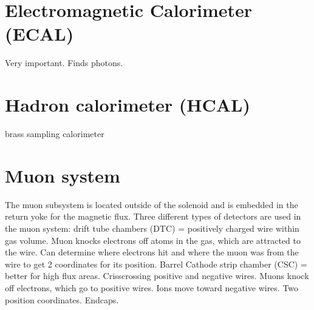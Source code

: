 
\section{Electromagnetic Calorimeter (ECAL)}
\label{sec:ECAL}

Very important. Finds photons.



\section{Hadron calorimeter (HCAL)}
\label{sec:HCAL}

brass sampling calorimeter


\section{Muon system}
\label{sec:Muon}

The muon subsystem is located outside of the solenoid and is embedded in the return yoke for the magnetic flux. Three different types of detectors are used in the muon system: drift tube chambers (DTC) = positively charged wire within gas volume. Muon knocks electrons off atoms in the gas, which are attracted to the wire. Can determine where electrons hit and where the muon was from the wire to get 2 coordinates for its position. Barrel
Cathode strip chamber (CSC) = better for high flux areas. Crisscrossing positive and negative wires. Muons knock off electrons, which go to positive wires. Ions move toward negative wires. Two position coordinates. Endcaps.


